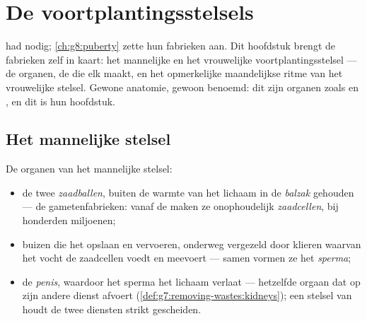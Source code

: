 \chapter{De voortplantingsstelsels}\label{ch:g8:reproductive-systems}

 had  nodig;
\cref{ch:g8:puberty} zette hun fabrieken aan. Dit hoofdstuk brengt de
fabrieken zelf in kaart: het mannelijke en het vrouwelijke
voortplantingsstelsel --- de organen, de  die elk maakt, en het
opmerkelijke maandelijkse ritme van het vrouwelijke stelsel. Gewone
anatomie, gewoon benoemd: dit zijn organen zoals  en , en dit is
hun hoofdstuk.

\section{Het mannelijke stelsel}

\begin{definition}\label{def:g8:reproductive-systems:male}
De organen van het mannelijke stelsel:
\begin{itemize}
  \item de twee \emph{zaadballen}, buiten de warmte van het
        lichaam in de \emph{balzak} gehouden --- de gametenfabrieken:
        vanaf de  maken ze onophoudelijk
        \emph{zaadcellen}, bij honderden miljoenen;
  \item buizen die het  opslaan en vervoeren, onderweg vergezeld door
        klieren waarvan het vocht de zaadcellen voedt en meevoert ---
        samen vormen ze het \emph{sperma};
  \item de \emph{penis}, waardoor het sperma het lichaam
        verlaat --- hetzelfde orgaan dat op zijn andere dienst 
        afvoert (\cref{def:g7:removing-wastes:kidneys}); een stelsel van
         houdt de twee diensten strikt gescheiden.
\end{itemize}
\end{definition}

